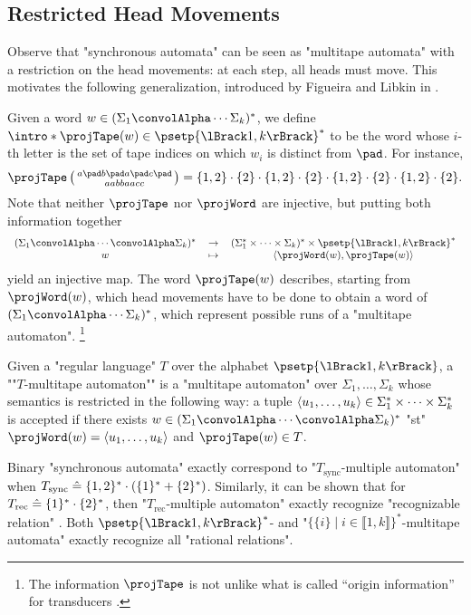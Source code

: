 \subsection{Restricted Head Movements}

Observe that "synchronous automata" can be seen as "multitape automata" with
a restriction on the head movements: at each step, all heads must move.
This motivates the following generalization, introduced by Figueira and Libkin in
\cite{FigueiraLibkin2015SynchronizingRelations}.

Given a word $w \in (\Sigma_1 \convolAlpha \cdots \Sigma_k)^*$,
we define \AP$\intro*\projTape(w) \in \psetp{\lBrack 1,k\rBrack}^*$ to be the word
whose $i$-th letter is the set of tape indices on which $w_i$ is distinct from $\pad$. 
For instance,
\[
	\projTape\pair{a \pad b \pad a \pad c \pad}{a a b b a a c c}
	= \{1,2\} \cdot \{2\} \cdot \{1,2\} \cdot \{2\} \cdot \{1,2\} \cdot \{2\} \cdot \{1,2\} \cdot \{2\}.
\]
Note that neither $\projTape$ nor $\projWord$ are injective, but putting both information together 
\[
	\begin{tabular}{ccc}
		$(\Sigma_1 \convolAlpha \cdots \convolAlpha \Sigma_k)^*$ & $\to$
			& $(\Sigma_1^* \times \cdots \times \Sigma_k)^* \times \psetp{\lBrack 1,k\rBrack}^*$\\
		$w$ & $\mapsto$ & $\tup{\projWord(w), \projTape(w)}$
	\end{tabular}
\]
yield an injective map.
The word $\projTape(w)$ describes, starting from $\projWord(w)$, which 
head movements have to be done to obtain a word of $(\Sigma_1 \convolAlpha \cdots \Sigma_k)^*$, which represent possible runs of a "multitape automaton".%
\footnote{The information $\projTape$ is not unlike what is called
``origin information'' for transducers \cite{Bojanczyk2014TransducersOriginInformation}.}

Given a "regular language" $T$ over the alphabet $\psetp{\lBrack 1,k\rBrack}$,
a \AP""$T$-multitape automaton"" is a "multitape automaton" over $\Sigma_1,\hdots,\Sigma_k$
whose semantics is restricted in the following way:
a tuple $\langle u_1,\hdots,u_k\rangle \in \Sigma_1^* \times \cdots \times \Sigma_k^*$ is accepted
if there exists $w \in (\Sigma_1 \convolAlpha \cdots \convolAlpha \Sigma_k)^*$
"st" $\projWord(w) = \tup{u_1,\hdots,u_k}$ and $\projTape(w) \in T$.

Binary "synchronous automata" exactly correspond to "$T_{\textrm{sync}}$-multiple automaton" when
$T_{\textrm{sync}} \mathrel{\hat{=}} \{1,2\}^* \cdot (\{1\}^* + \{2\}^*)$. Similarly, it can be shown
that for $T_{\textrm{rec}} \mathrel{\hat{=}} \{1\}^* \cdot \{2\}^*$, then "$T_{\textrm{rec}}$-multiple automaton" exactly recognize "recognizable relation"
\cite[Proposition~1]{FigueiraLibkin2015SynchronizingRelations}.
Both $\psetp{\lBrack 1,k\rBrack}^*$- and
"$\{\{i\} \mid i \in \lBrack 1,k\rBrack\}^*$-multitape automata"
exactly recognize all "rational relations".%

